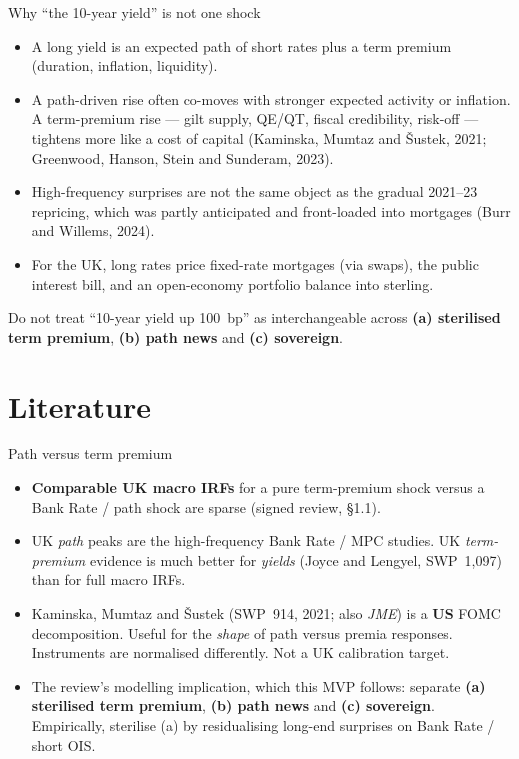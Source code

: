 \documentclass[11pt,aspectratio=169]{beamer}
\begin{document}
\begin{frame}{Why ``the 10-year yield'' is not one shock}
  \begin{itemize}
    \item A long yield is an expected path of short rates plus a term
          premium (duration, inflation, liquidity).
    \item A path-driven rise often co-moves with stronger expected
          activity or inflation. A term-premium rise --- gilt supply,
          QE/QT, fiscal credibility, risk-off --- tightens more like a
          cost of capital
          (Kaminska, Mumtaz and \v{S}ustek, 2021;
          Greenwood, Hanson, Stein and Sunderam, 2023).
    \item High-frequency surprises are not the same object as the
          gradual 2021--23 repricing, which was partly anticipated and
          front-loaded into mortgages (Burr and Willems, 2024).
    \item For the UK, long rates price fixed-rate mortgages (via swaps),
          the public interest bill, and an open-economy portfolio balance
          into sterling.
  \end{itemize}
  \vspace{0.35em}
  {\footnotesize Do not treat ``10-year yield up 100~bp'' as interchangeable
  across \textbf{(a) sterilised term premium}, \textbf{(b) path news}
  and \textbf{(c) sovereign}.}
\end{frame}

\section{Literature}
\begin{frame}{Path versus term premium}
  \begin{itemize}
    \item \textbf{Comparable UK macro IRFs} for a pure term-premium shock
          versus a Bank Rate / path shock are sparse
          (signed review, \S1.1).
    \item UK \emph{path} peaks are the high-frequency Bank Rate / MPC
          studies. UK \emph{term-premium} evidence is much better for
          \emph{yields} (Joyce and Lengyel, SWP~1,097) than for full
          macro IRFs.
    \item Kaminska, Mumtaz and \v{S}ustek (SWP~914, 2021; also \emph{JME})
          is a \textbf{US} FOMC decomposition. Useful for the
          \emph{shape} of path versus premia responses. Instruments are
          normalised differently. Not a UK calibration target.
    \item The review's modelling implication, which this MVP follows:
          separate \textbf{(a) sterilised term premium},
          \textbf{(b) path news} and \textbf{(c) sovereign}.
          Empirically, sterilise (a) by residualising long-end surprises
          on Bank Rate / short OIS.
  \end{itemize}
\end{frame}
\end{document}
